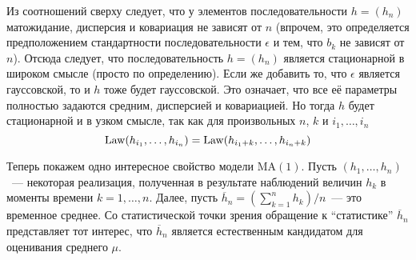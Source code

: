 Из соотношений сверху следует, что у элементов последовательности \(h = 
(h_{n})\) матожидание, дисперсия и ковариация не зависят от \(n\) (впрочем, это 
определяется предположением стандартности последовательности \(\epsilon\) и 
тем, что \(b_{k}\) не зависят от \(n\)). Отсюда следует, что последовательность 
\(h = (h_{n})\) является стационарной в широком смысле (просто по определению). 
Если же добавить то, что \(\epsilon\) является гауссовской, то и \(h\) тоже 
будет гауссовской. Это означает, что все её параметры полностью задаются 
средним, дисперсией и ковариацией. Но тогда \(h\) будет стационарной и в узком 
смысле, так как для произвольных \(n\), \(k\) и \(i_{1}, \ldots, i_{n}\)
\[
	\operatorname{Law}(h_{i_{1}}, \ldots, h_{i_{n}}) = \operatorname{Law}(h_{i_{1} + k}, \ldots, h_{i_{n} + 
	k})
\]

Теперь покажем одно интересное свойство модели \(\mathrm{MA}(1)\). Пусть 
\((h_{1}, \ldots, h_{n})\)~--- некоторая реализация, полученная в результате 
наблюдений величин \(h_{k}\) в моменты времени \(k = 1, \ldots, n\). Далее, 
пусть \(\overline{h}_{n} = (\sum_{k = 1}^{n} h_{k})/n\)~--- это временное 
среднее. Со статистической точки зрения обращение к ``статистике'' 
\(\overline{h}_{n}\) представляет тот интерес, что \(\overline{h}_{n}\) 
является естественным кандидатом для оценивания среднего \(\mu\). 


